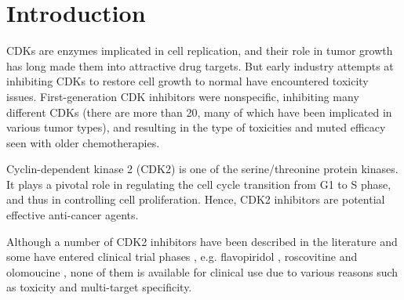 \documentclass[10pt,letterpaper]{article}
\begin{document}

\linenumbers

\section*{Introduction}

CDKs are enzymes implicated in cell replication, and their role in tumor growth has long made them into attractive drug targets. But early industry attempts at inhibiting CDKs to restore cell growth to normal have encountered toxicity issues. First-generation CDK inhibitors were nonspecific, inhibiting many different CDKs (there are more than 20, many of which have been implicated in various tumor types), and resulting in the type of toxicities and muted efficacy seen with older chemotherapies.

Cyclin-dependent kinase 2 (CDK2) is one of the serine/threonine protein kinases. It plays a pivotal role in regulating the cell cycle transition from G1 to S phase, and thus in controlling cell proliferation. Hence, CDK2 inhibitors are potential effective anti-cancer agents.

Although a number of CDK2 inhibitors have been described in the literature and some have entered clinical trial phases \cite{1603}, e.g. flavopiridol \cite{1596}, roscovitine \cite{1597} and olomoucine \cite{1598}, none of them is available for clinical use due to various reasons such as toxicity and multi-target specificity.
\end{document}
